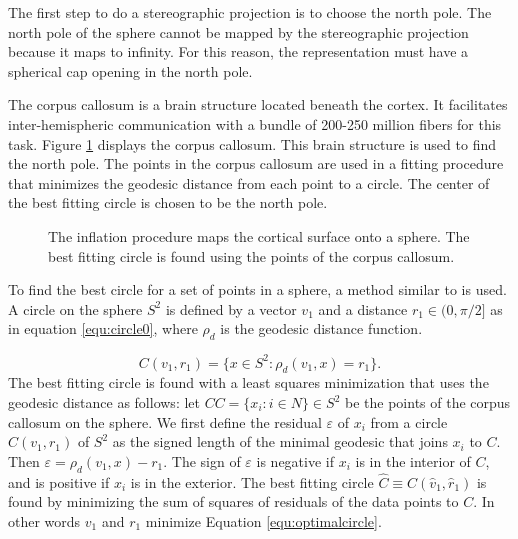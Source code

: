 \documentclass[a4paper,twoside]{article}
\begin{document}
The first step to do a stereographic projection is to choose the north pole. 
The north pole of the sphere cannot be mapped by the stereographic projection because it
maps to infinity. For this reason, the representation must have a spherical cap opening in 
the north pole.

The corpus callosum is a brain structure located 
beneath the cortex. It facilitates inter-hemispheric communication with a bundle of 200-250 million fibers for this task.
Figure \ref{fig:Corpuscallosum} displays the corpus callosum. 
This brain structure is used to find the north pole.
The points in the corpus callosum are used in a fitting procedure that minimizes the geodesic distance from each point to a circle. 
The center of the best fitting circle is chosen to be the north pole.

\begin{figure} 
 \centering 
 \caption[Inflation procedure, mapping the cortex on a sphere.]{The inflation procedure maps the cortical surface onto a sphere. 
          The best fitting circle is found using the points of the corpus callosum.}
 \label{fig:Corpuscallosum}  
\end{figure}

To find the best circle for a set of points in a sphere, a method similar to \cite{jung_analysis_2012} is used.
A circle on the sphere $S^2$ is defined by a vector $v_1$ and a distance $r_1 \in (0, \pi/2]$ as in equation \ref{equ:circle0},
where $\rho_d$ is the geodesic distance function.

\begin{equation}  
  C(v_1, r_1) = \{x \in S^2 : \rho_d(v_1, x) = r_1\}.
  \label{equ:circle0}
\end{equation}
The best fitting circle is found with a least squares minimization
that uses the geodesic distance as follows:
let $CC = \{x_i: i \in N\} \in S^2$ be the points of the corpus callosum on the sphere. We first define the residual $\varepsilon$ of $x_i$ from a circle
$C( v_1 , r_1 )$ of $S^2$ as the signed length of the minimal geodesic that joins $x_i$ to $C$. Then 
$\varepsilon = \rho_d( v_1 , x ) - r_1$. The sign of $\varepsilon$ is negative if $x_i$ is in the interior of $C$, and is positive if $x_i$ is in the exterior.
The best fitting circle $\hat{C} \equiv C( \hat{v}_1 , \hat{r}_1 )$ 
is found by minimizing the sum of squares of residuals of the data points to $C$. 
In other words $v_1$ and $r_1$ minimize Equation \ref{equ:optimalcircle}.
\end{document}
